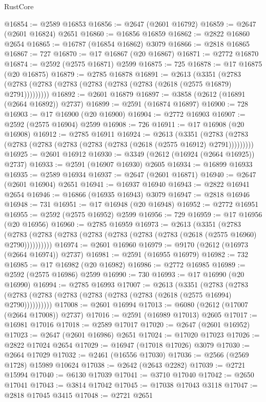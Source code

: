 \begin{lexlean}{RustCore}
\begin{coremodule}
@16854 := @2589 @16853
@16856 := @2647 (@2601 @16792)
@16859 := @2647 (@2601 @16824) @2651
@16860 := @16856 @16859
@16862 := @2822 @16860 @2654
@16865 := @16787 (@16854 @16862) @3079
@16866 := @2818 @16865
@16867 := 727
@16870 := @17 @16867 (@20 @16867)
@16871 := @2772 @16870
@16874 := @2592 (@2575 @16871) @2599
@16875 := 725
@16878 := @17 @16875 (@20 @16875)
@16879 := @2785 @16878
@16891 := @2613
    (@3351 (@2783 (@2783 (@2783 (@2783 (@2783 (@2783 (@2783 (@2618 (@2575 @16879) @2791)))))))))
@16892 := @2601 @16879
@16897 := @3858 (@2612 (@16891 (@2664 @16892)) @2737)
@16899 := @2591 (@16874 @16897)
@16900 := 728
@16903 := @17 @16900 (@20 @16900)
@16904 := @2772 @16903
@16907 := @2592 (@2575 @16904) @2599
@16908 := 726
@16911 := @17 @16908 (@20 @16908)
@16912 := @2785 @16911
@16924 := @2613
    (@3351 (@2783 (@2783 (@2783 (@2783 (@2783 (@2783 (@2783 (@2618 (@2575 @16912) @2791)))))))))
@16925 := @2601 @16912
@16930 := @3349 (@2612 (@16924 (@2664 @16925)) @2737)
@16933 := @2591 (@16907 @16930) @2605
@16934 := @16899 @16933
@16935 := @2589 @16934
@16937 := @2647 (@2601 @16871)
@16940 := @2647 (@2601 @16904) @2651
@16941 := @16937 @16940
@16943 := @2822 @16941 @2654
@16946 := @16866 (@16935 @16943) @3079
@16947 := @2818 @16946
@16948 := 731
@16951 := @17 @16948 (@20 @16948)
@16952 := @2772 @16951
@16955 := @2592 (@2575 @16952) @2599
@16956 := 729
@16959 := @17 @16956 (@20 @16956)
@16960 := @2785 @16959
@16973 := @2613
    (@3351
      (@2783 (@2783 (@2783 (@2783 (@2783 (@2783 (@2783 (@2783 (@2618 (@2575 @16960) @2790))))))))))
@16974 := @2601 @16960
@16979 := @9170 (@2612 (@16973 (@2664 @16974)) @2737)
@16981 := @2591 (@16955 @16979)
@16982 := 732
@16985 := @17 @16982 (@20 @16982)
@16986 := @2772 @16985
@16989 := @2592 (@2575 @16986) @2599
@16990 := 730
@16993 := @17 @16990 (@20 @16990)
@16994 := @2785 @16993
@17007 := @2613
    (@3351
      (@2783 (@2783 (@2783 (@2783 (@2783 (@2783 (@2783 (@2783 (@2618 (@2575 @16994) @2790))))))))))
@17008 := @2601 @16994
@17013 := @6080 (@2612 (@17007 (@2664 @17008)) @2737)
@17016 := @2591 (@16989 @17013) @2605
@17017 := @16981 @17016
@17018 := @2589 @17017
@17020 := @2647 (@2601 @16952)
@17023 := @2647 (@2601 @16986) @2651
@17024 := @17020 @17023
@17026 := @2822 @17024 @2654
@17029 := @16947 (@17018 @17026) @3079
@17030 := @2664 @17029
@17032 := @2461 (@16556 @17030)
@17036 := @2566 (@2569 @1728) @15989 @10624
@17038 := @2642 (@2643 @2282)
@17039 := @2721 @15994
@17040 := @6130 @17039
@17041 := @3710 @17040
@17042 := @2650 @17041
@17043 := @3814 @17042
@17045 := @17038 @17043 @3118
@17047 := @2818 @17045 @3415
@17048 := @2721 @2651

\end{coremodule}
\end{lexlean}
